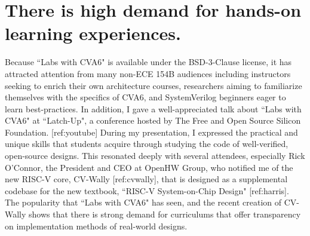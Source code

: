 \section{There is high demand for hands-on learning experiences.}

Because ``Labs with CVA6" is available under the BSD-3-Clause license, it has attracted attention from many non-ECE 154B audiences including instructors seeking to enrich their own architecture courses, researchers aiming to familiarize themselves with the specifics of CVA6, and SystemVerilog beginners eager to learn best-practices. In addition, I gave a well-appreciated talk about ``Labs with CVA6" at ``Latch-Up", a conference hosted by The Free and Open Source Silicon Foundation. [ref:youtube] During my presentation, I expressed the practical and unique skills that students acquire through studying the code of well-verified, open-source designs. This resonated deeply with several attendees, especially Rick O'Connor, the President and CEO at OpenHW Group, who notified me of the new RISC-V core, CV-Wally [ref:cvwally], that is designed as a supplemental codebase for the new textbook, ``RISC-V System-on-Chip Design" [ref:harris]. The popularity that ``Labs with CVA6" has seen, and the recent creation of CV-Wally shows that there is strong demand for curriculums that offer transparency on implementation methods of real-world designs.
